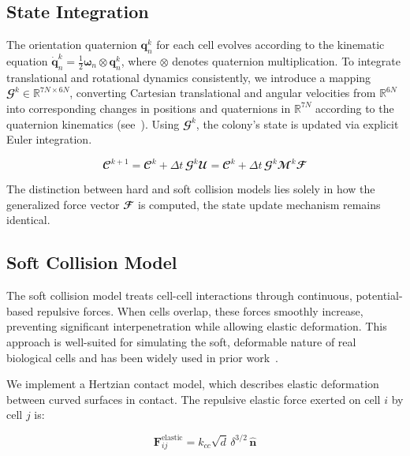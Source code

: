 \documentclass[conference]{IEEEtran}
\begin{document}
\subsection{State Integration}

The orientation quaternion $\mathbf{q}_n^k$ for each cell evolves according to the kinematic equation $\dot{\mathbf{q}}_n^k = \frac{1}{2} \boldsymbol{\omega}_n \otimes \mathbf{q}_n^k$, where $\otimes$ denotes quaternion multiplication. To integrate translational and rotational dynamics consistently, we introduce a mapping $\mathbfcal{G}^k \in \mathbb{R}^{7N \times 6N}$, converting Cartesian translational and angular velocities from $\mathbb{R}^{6N}$ into corresponding changes in positions and quaternions in $\mathbb{R}^{7N}$ according to the quaternion kinematics (see~\cite{Weady2024SM,Yan2022,Tasora2008}). Using $\mathbfcal{G}^k$, the colony's state is updated via explicit Euler integration.

\begin{equation} \label{eq:colony_update}
    \mathbfcal{C}^{k+1} = \mathbfcal{C}^k + \Delta t \, \mathbfcal{G}^k \mathbfcal{U} = \mathbfcal{C}^k + \Delta t \, \mathbfcal{G}^k \mathbfcal{M}^k \mathbfcal{F}
\end{equation}

The distinction between hard and soft collision models lies solely in how the generalized force vector $\mathbfcal{F}$ is computed, the state update mechanism remains identical.

\subsection{Soft Collision Model}

The soft collision model treats cell-cell interactions through continuous, potential-based repulsive forces. When cells overlap, these forces smoothly increase, preventing significant interpenetration while allowing elastic deformation. This approach is well-suited for simulating the soft, deformable nature of real biological cells and has been widely used in prior work~\cite{Warren2019, You2018,Blanchard2015,Ghosh2015,Khan_2024,You_2021,Valdez2025,Rudge2013,Langeslay_2023}.

We implement a Hertzian contact model, which describes elastic deformation between curved surfaces in contact. The repulsive elastic force exerted on cell $i$ by cell $j$ is:

\begin{equation} \label{eq:hertzian_contact_model}
    \mathbf{F}^{\text{elastic}}_{ij} = k_{cc} \sqrt{d} \, \delta^{3/2} \, \hat{\mathbf{n}}
\end{equation}
\end{document}
